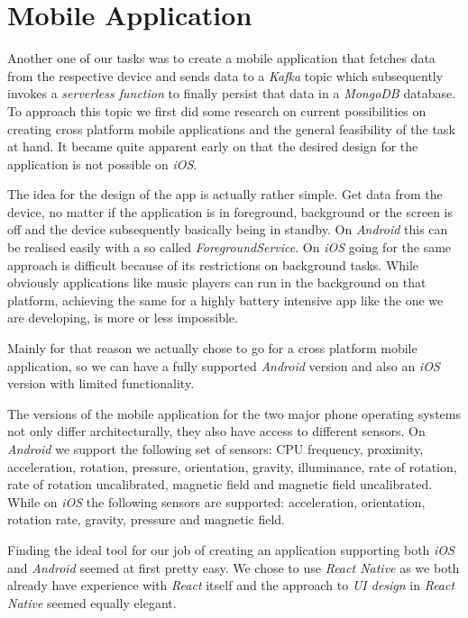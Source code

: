 \section{Mobile Application}

Another one of our tasks was to create a mobile application that fetches data from the respective
device and sends data to a \textit{Kafka} topic which subsequently invokes a \textit{serverless
function} to finally persist that data in a \textit{MongoDB} database. To approach this topic we
first did some research on current possibilities on creating cross platform mobile applications and
the general feasibility of the task at hand. It became quite apparent early on that the desired
design for the application is not possible on \textit{iOS}.

The idea for the design of the app is actually rather simple. Get data from the device, no matter if
the application is in foreground, background or the screen is off and the device subsequently
basically being in standby. On \textit{Android} this can be realised easily with a so called
\textit{ForegroundService}. On \textit{iOS} going for the same approach is difficult because of its
restrictions on background tasks. While obviously applications like music players can run in the
background on that platform, achieving the same for a highly battery intensive app like the one we
are developing, is more or less impossible.

Mainly for that reason we actually chose to go for a cross platform mobile application, so we can
have a fully supported \textit{Android} version and also an \textit{iOS} version with limited
functionality.

The versions of the mobile application for the two major phone operating systems not only differ
architecturally, they also have access to different sensors. On \textit{Android} we support the
following set of sensors: CPU frequency, proximity, acceleration, rotation, pressure, orientation,
gravity, illuminance, rate of rotation, rate of rotation uncalibrated, magnetic field and magnetic
field uncalibrated. While on \textit{iOS} the following sensors are supported: acceleration,
orientation, rotation rate, gravity, pressure and magnetic field.

Finding the ideal tool for our job of creating an application supporting both \textit{iOS} and
\textit{Android} seemed at first pretty easy. We chose to use \textit{React Native}
\cite{react-native} as we both already have experience with \textit{React} \cite{react} itself and
the approach to \textit{UI design} in \textit{React Native} seemed equally elegant.

